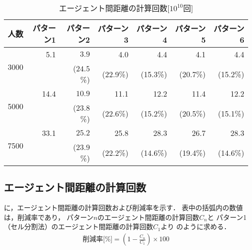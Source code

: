 
\begin{table}[tb]
\begin{center}
\caption{エージェント間距離の計算回数[$10^{10}$回]}
\label{tb:count_result_yobi}
\begin{tabular}{c|r|r|r|r|r|r}
\hline \hline
	人数 & パターン1 & パターン2 & パターン3 & パターン4 & パターン5 & パターン6 \\  
	\hline
	\multirow{2}{*}{3000} 
	& 5.1   & $\mathbf{3.9}$   & 4.0    & 4.4    & 4.1    & 4.4   \\  
	&       & ($\mathbf{24.5}$\%) 					& (22.9\%) & (15.3\%) & (20.7\%) & (15.2\%) \\ \hline
	\multirow{2}{*}{5000} 
	& 14.4  &  $\mathbf{10.9}$  					  & 11.1   & 12.2   & 11.4   & 12.2  \\  
	&       & ($\mathbf{23.8}$\%) 					& (22.6\%) & (15.2\%) & (20.5\%) & (15.1\%) \\ \hline
	\multirow{2}{*}{7500} 
	& 33.1  & $\mathbf{25.2}$	 		    	 	 & 25.8   & 28.3   & 26.7   & 28.3  \\ 
	&       & ($\mathbf{23.9}$\%) 					& (22.2\%) & (14.6\%) & (19.4\%) & (14.6\%) \\ \hline
    \end{tabular}
  \end{center}
\end{table}


\subsection{エージェント間距離の計算回数}
\label{sec:count}
に，エージェント間距離の計算回数および削減率を示す．
表中の括弧内の数値は，削減率であり，
パターン$n$のエージェント間距離の計算回数$C_{n}$と
パターン1（セル分割法）のエージェント間距離の計算回数$C_{1}$より
のように求める．
%
\begin{align}
	\mbox{削減率[\%]} = ( 1 - \frac{C_{n}}{C_{1}}) \times 100
    \label{eq:sakugen}
\end{align}

